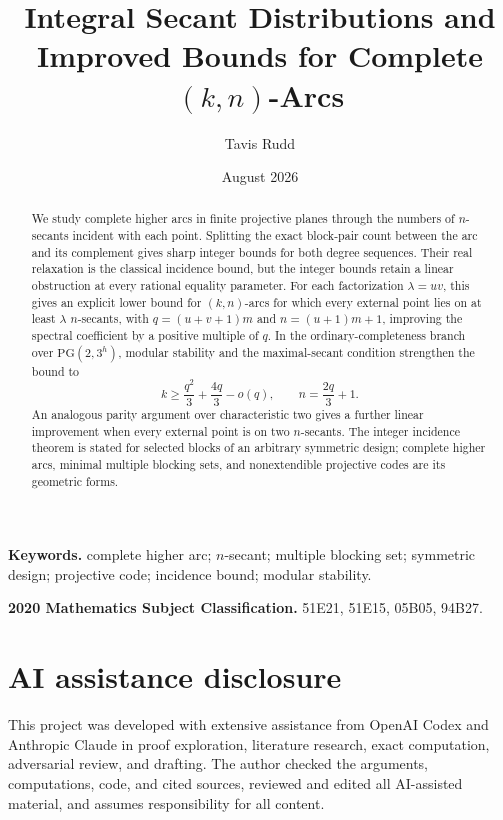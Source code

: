 \documentclass[11pt]{article}
\title{Integral Secant Distributions and Improved Bounds for Complete
\texorpdfstring{\((k,n)\)}{(k,n)}-Arcs}
\author{Tavis Rudd}
\date{August 2026}
\numberwithin{equation}{section}
\theoremstyle{definition}
\theoremstyle{remark}
\newcommand{\PG}{\mathrm{PG}}
\begin{document}
\maketitle

\begin{abstract}
We study complete higher arcs in finite projective planes through the numbers
of \(n\)-secants incident with each point.  Splitting the exact block-pair
count between the arc and its complement gives sharp integer bounds for both
degree sequences.  Their real relaxation is the classical incidence bound,
but the integer bounds retain a linear obstruction at every rational equality
parameter.
For each factorization \(\lambda=uv\), this gives an explicit lower bound for
\((k,n)\)-arcs for which every external point lies on at least \(\lambda\)
\(n\)-secants, with \(q=(u+v+1)m\) and \(n=(u+1)m+1\), improving the
spectral coefficient by a
positive multiple of \(q\).  In the ordinary-completeness branch over
\(\PG(2,3^h)\), modular stability and the maximal-secant condition strengthen
the bound to
\[
 k\ge \frac{q^2}{3}+\frac{4q}{3}-o(q),
 \qquad n=\frac{2q}{3}+1.
\]
An analogous parity argument over characteristic two gives a further linear
improvement when every external point is on two \(n\)-secants.  The integer
incidence theorem is stated for
selected blocks of an arbitrary symmetric design; complete higher arcs,
minimal multiple blocking sets, and nonextendible projective codes
are its geometric forms.
\end{abstract}

\noindent\textbf{Keywords.} complete higher arc; \(n\)-secant; multiple
blocking set; symmetric design; projective code; incidence bound; modular
stability.

\smallskip
\noindent\textbf{2020 Mathematics Subject Classification.} 51E21, 51E15,
05B05, 94B27.









\section*{AI assistance disclosure}

This project was developed with extensive assistance from OpenAI Codex and
Anthropic Claude in proof exploration, literature research, exact computation,
adversarial review, and drafting.  The author checked the arguments,
computations, code, and cited sources, reviewed and edited all AI-assisted
material, and assumes responsibility for all content.
\end{document}
